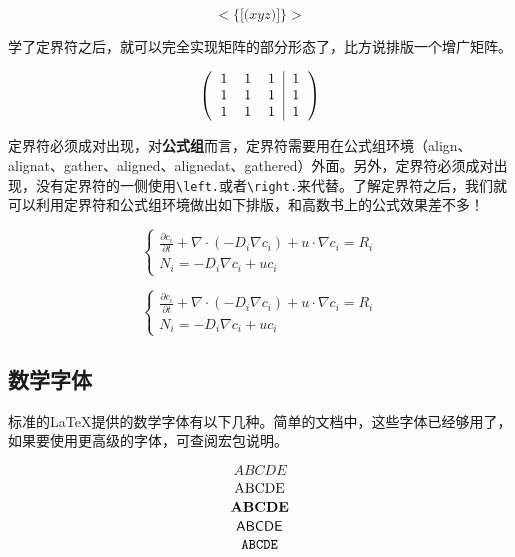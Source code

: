 \begin{codeshow}
\[ \Bigg< \bigg\{ \Big[ \big( xyz \big) \Big] \bigg\} \Bigg> \]
\end{codeshow}

学了定界符之后，就可以完全实现矩阵的部分形态了，比方说排版一个增广矩阵。

\begin{codeshow}
\[
\left(
\begin{tabular}{ccc|c}
1 & 1 & 1 & 1 \\
1 & 1 & 1 & 1 \\
1 & 1 & 1 & 1 
\end{tabular}
\right)
\]
\end{codeshow}

定界符必须成对出现，对\textbf{公式组}而言，定界符需要用在公式组环境（align、alignat、gather、aligned、alignedat、gathered）外面。另外，定界符必须成对出现，没有定界符的一侧使用\lstinline|\left.|或者\lstinline|\right.|来代替。了解定界符之后，我们就可以利用定界符和公式组环境做出如下排版，和高数书上的公式效果差不多！

\begin{equation}
\left\{
\begin{gathered}
\frac{\partial c_i}{\partial t}+\nabla \cdot (-D_{i} \nabla c_{i})+u \cdot \nabla c_{i}=R_i \\
N_{i}=-D_{i}\nabla c_{i}+uc_{i}
\end{gathered}
\right.
\end{equation}

\begin{latex}
\begin{equation}
\left\{
\begin{gathered}
\frac{\partial c_i}{\partial t}+\nabla \cdot (-D_{i} \nabla c_{i})+u \cdot \nabla c_{i}=R_i \\
N_{i}=-D_{i}\nabla c_{i}+uc_{i}
\end{gathered}
\right.
\end{equation}
\end{latex}

\subsection{数学字体}
标准的\LaTeX 提供的数学字体有以下几种。简单的文档中，这些字体已经够用了，如果要使用更高级的字体，可查阅\CTeX 宏包说明。
\begin{codeshow}
\[
\mathit{ABCDE}\]
\[
\mathrm{ABCDE}\\\]
\[
\mathbf{ABCDE}\\\]
\[
\mathsf{ABCDE}\\\]
\[
\mathtt{ABCDE}\\\]
\end{codeshow}

